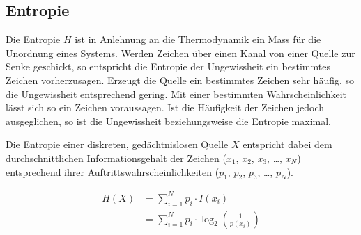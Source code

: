 \subsection{Entropie}

Die Entropie $H$ ist in Anlehnung an die Thermodynamik ein Mass für die Unordnung eines Systems. Werden Zeichen über einen Kanal von einer Quelle zur Senke geschickt, so entspricht die Entropie der Ungewissheit ein bestimmtes Zeichen vorherzusagen. Erzeugt die Quelle ein bestimmtes Zeichen sehr häufig, so die Ungewissheit entsprechend gering. Mit einer bestimmten Wahrscheinlichkeit lässt sich so ein Zeichen voraussagen. Ist die Häufigkeit der Zeichen jedoch ausgeglichen, so ist die Ungewissheit beziehungsweise die Entropie maximal. 

Die Entropie einer diskreten, gedächtnislosen Quelle $X$ entspricht dabei dem durchschnittlichen Informationsgehalt der Zeichen ($x_1$, $x_2$, $x_3$, \ldots, $x_N$) entsprechend ihrer Auftrittswahrscheinlichkeiten ($p_1$, $p_2$, $p_3$, \ldots, $p_N$). 

\begin{align*}
H(X)& =\sum\limits_{i=1}^N p_i \cdot I(x_i) \\
& =\sum\limits_{i=1}^N p_i \cdot \log_2\left(\frac{1}{p(x_i)}\right)
\end{align*}
